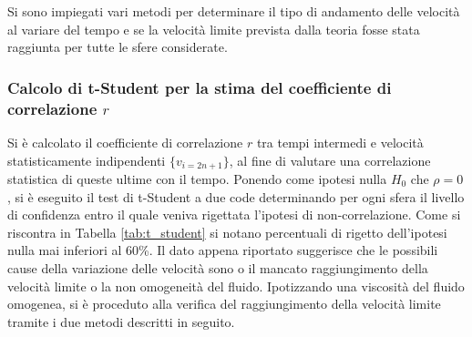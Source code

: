 \documentclass[a4paper,11pt,oneside]{article}
\begin{document}
Si sono impiegati vari metodi per determinare il tipo di andamento delle velocità al variare del tempo e se la velocità limite prevista dalla teoria fosse stata raggiunta per tutte le sfere considerate.

\subsubsection*{Calcolo di t-Student per la stima del coefficiente di correlazione $r$}
Si è calcolato il coefficiente di correlazione $r$ tra tempi intermedi e velocità statisticamente indipendenti $\{ v_{i=2n+1}\}$, al fine di valutare una correlazione statistica di queste ultime con il tempo.
Ponendo come ipotesi nulla $H_{0}$ che $\rho=0$, si è eseguito il test di t-Student a due code determinando per ogni sfera il livello di confidenza entro il quale veniva rigettata l'ipotesi di non-correlazione. \newline
Come si riscontra in Tabella \ref{tab:t_student} si notano percentuali di rigetto dell'ipotesi nulla  mai inferiori al 60\%.
Il dato appena riportato suggerisce che le possibili cause della variazione delle velocità sono o il mancato raggiungimento della velocità limite o la non omogeneità del fluido. Ipotizzando una viscosità del fluido omogenea, si è proceduto alla verifica del raggiungimento della velocità limite tramite i due metodi descritti in seguito.
\end{document}
